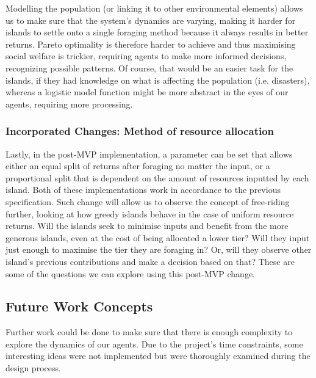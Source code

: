 Modelling the population (or linking it to other environmental elements) allows us to make sure that the system’s dynamics are varying, making it harder for islands to settle onto a single foraging method because it always results in better returns. Pareto optimality is therefore harder to achieve and thus maximising social welfare is trickier, requiring agents to make more informed decisions, recognizing possible patterns. Of course, that would be an easier task for the islands, if they had knowledge on what is affecting the population (i.e. disasters), whereas a logistic model function might be more abstract in the eyes of our agents, requiring more processing. \\

\subsubsection{ Incorporated Changes: Method of resource allocation}

Lastly, in the post-MVP implementation, a parameter can be set that allows either an equal split of returns after foraging no matter the input, or a proportional split that is dependent on the amount of resources inputted by each island. Both of these implementations work in accordance to the previous specification. Such change will allow us to observe the concept of free-riding further, looking at how greedy islands behave in the case of uniform resource returns. Will the islands seek to minimise inputs and benefit from the more generous islands, even at the cost of being allocated a lower tier? Will they input just enough to maximise the tier they are foraging in? Or, will they observe other island’s previous contributions and make a decision based on that? These are some of the questions we can explore using this post-MVP change. \\

\subsection{Future Work Concepts}

Further work could be done to make sure that there is enough complexity to explore the dynamics of our agents. Due to the project’s time constraints, some interesting ideas were not implemented but were thoroughly examined during the design process.\\

